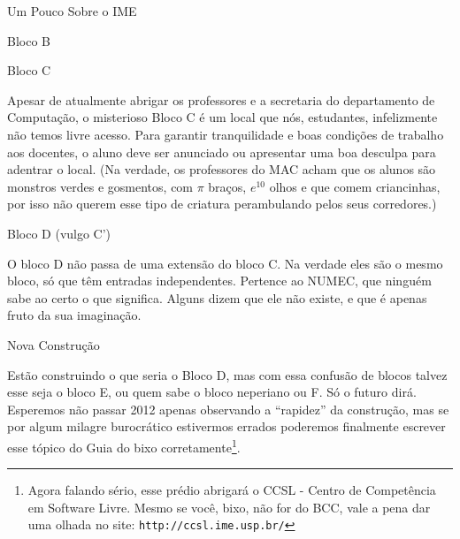 \begin{secao}{Um Pouco Sobre o IME}
\begin{subsecao}{Bloco B}
\begin{itemize}
\end{itemize}
\end{subsecao}

\begin{subsecao}{Bloco C}

  Apesar de atualmente abrigar os professores e a secretaria do
  departamento de Computação, o misterioso Bloco C é um local que nós,
  estudantes, infelizmente não temos livre acesso. Para garantir
  tranquilidade e boas condições de trabalho aos docentes, o aluno deve
  ser anunciado ou apresentar uma boa desculpa para adentrar o local.
  (Na verdade, os professores do MAC acham que os alunos
  são monstros verdes e gosmentos, com $\pi$ braços, $e^{10}$ olhos e que
  comem criancinhas, por isso não querem esse tipo de criatura perambulando
  pelos seus corredores.)

\end{subsecao}

\begin{subsecao}{Bloco D (vulgo C')}

  O bloco D não passa de uma extensão do bloco C. Na verdade eles são o
  mesmo bloco, só que têm entradas independentes. Pertence ao NUMEC, que
  ninguém sabe ao certo o que significa. Alguns dizem que ele não existe,
  e que é apenas fruto da sua imaginação.

\end{subsecao}


\begin{subsecao}{Nova Construção}

Estão construindo o que seria o Bloco D, mas com essa confusão de blocos talvez esse seja o bloco E, ou quem sabe o bloco neperiano ou F. Só o futuro dirá. Esperemos não passar 2012 apenas observando a “rapidez” da construção, mas se por algum milagre burocrático estivermos errados poderemos finalmente escrever esse tópico do Guia do bixo corretamente\footnote{Agora falando sério, esse prédio abrigará o CCSL - Centro de Competência em Software Livre. Mesmo se você, bixo, não for do BCC, vale a pena dar uma olhada no site: {\tt http://ccsl.ime.usp.br/}}. 


\end{subsecao}
\end{secao}
